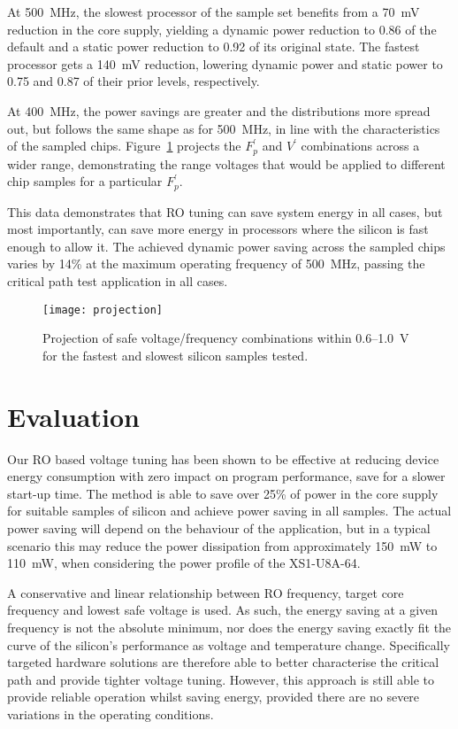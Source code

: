 \documentclass[a4paper,twocolumn,DIV=16]{scrartcl}
\begin{document}
At 500~MHz, the slowest processor of the sample set benefits from a 70~mV
reduction in the core supply, yielding a dynamic power reduction to 0.86 of the
default and a static power reduction to 0.92 of its original state. The
fastest processor gets a 140~mV reduction, lowering dynamic power and static
power to 0.75 and 0.87 of their prior levels, respectively.

At 400~MHz, the power savings are greater and the distributions more spread out,
but follows the same shape as for 500~MHz, in line with the characteristics of
the sampled chips. Figure~\ref{fig:projection} projects the $F_p^\prime$ and
$V^\prime$ combinations across a wider range, demonstrating the range voltages
that would be applied to different chip samples for a particular $F_p^\prime$.

This data demonstrates that RO tuning can save system energy in all cases, but
most importantly, can save more energy in processors where the silicon is fast
enough to allow it. The achieved dynamic power saving across the sampled chips
varies by 14\% at the maximum operating frequency of 500~MHz, passing the
critical path test application in all cases.


\begin{figure}
\centerline{\texttt{[image: projection]}}
\caption{Projection of safe voltage/frequency combinations within 0.6--1.0~V
for the fastest and slowest silicon samples tested.}
\label{fig:projection}
\end{figure}

\section{Evaluation}
\label{sec:ev}

Our RO based voltage tuning has been shown to be effective at reducing device
energy consumption with zero impact on program performance, save for a slower
start-up time. The method is able to save over 25\% of power in the core supply
for suitable samples of silicon and achieve power saving in all samples. The
actual power saving will depend on the behaviour of the application, but in a
typical scenario this may reduce the power dissipation from approximately 150~mW
to 110~mW, when considering the power profile of the XS1-U8A-64.

A conservative and linear relationship between RO frequency, target core
frequency and lowest safe voltage is used. As such, the energy saving at a given
frequency is not the absolute minimum, nor does the energy saving exactly fit
the curve of the silicon's performance as voltage and temperature change.
Specifically targeted hardware solutions are therefore able to better
characterise the critical path and provide tighter voltage tuning.  However,
this approach is still able to provide reliable operation whilst saving energy,
provided there are no severe variations in the operating conditions.
\end{document}
